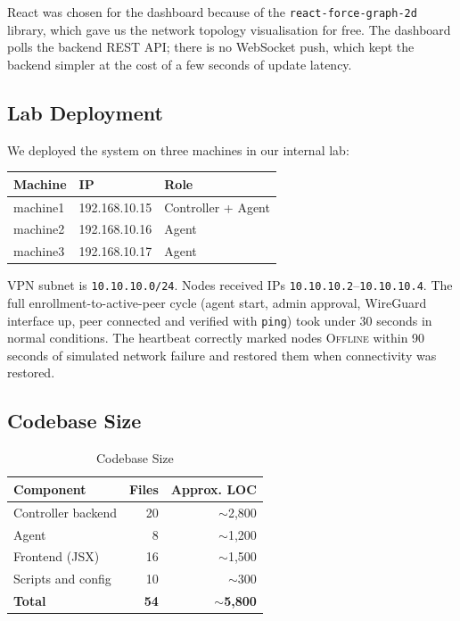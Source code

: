 \documentclass[conference]{IEEEtran}
\begin{document}
React was chosen for the dashboard because of the
\texttt{react-force-graph-2d} library, which gave us the network topology
visualisation for free. The dashboard polls the backend REST API; there is
no WebSocket push, which kept the backend simpler at the cost of a few
seconds of update latency.

\subsection{Lab Deployment}

We deployed the system on three machines in our internal lab:

\begin{center}
\small
\begin{tabular}{lll}
\toprule
\textbf{Machine} & \textbf{IP} & \textbf{Role} \\
\midrule
machine1 & 192.168.10.15 & Controller + Agent \\
machine2 & 192.168.10.16 & Agent \\
machine3 & 192.168.10.17 & Agent \\
\bottomrule
\end{tabular}
\end{center}

VPN subnet is \texttt{10.10.10.0/24}. Nodes received IPs
\texttt{10.10.10.2}--\texttt{10.10.10.4}. The full enrollment-to-active-peer
cycle (agent start, admin approval, WireGuard interface up, peer connected
and verified with \texttt{ping}) took under 30 seconds in normal conditions.
The heartbeat correctly marked nodes \textsc{Offline} within 90 seconds of
simulated network failure and restored them when connectivity was restored.

\subsection{Codebase Size}

\begin{table}[!t]
\caption{Codebase Size}
\label{tab:codebase}
\centering
\begin{tabular}{lrr}
\toprule
\textbf{Component} & \textbf{Files} & \textbf{Approx. LOC} \\
\midrule
Controller backend  & 20 & $\sim$2,800 \\
Agent               &  8 & $\sim$1,200 \\
Frontend (JSX)      & 16 & $\sim$1,500 \\
Scripts and config  & 10 & $\sim$300 \\
\midrule
\textbf{Total} & \textbf{54} & \textbf{$\sim$5,800} \\
\bottomrule
\end{tabular}
\end{table}
\end{document}
